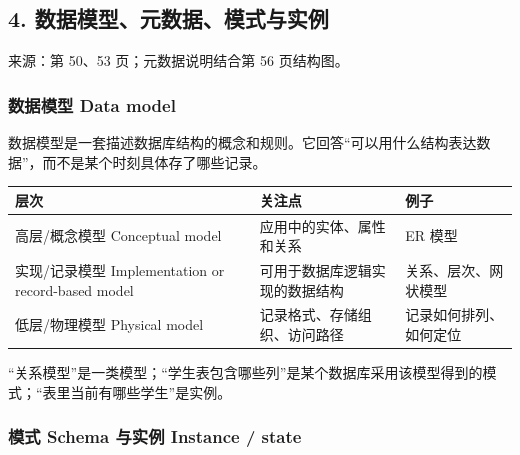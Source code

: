 \subsection{4. 数据模型、元数据、模式与实例}\label{01_database_fundamentals_zh-ux6570ux636eux6a21ux578bux5143ux6570ux636eux6a21ux5f0fux4e0eux5b9eux4f8b}

来源：第 50、53 页；元数据说明结合第 56 页结构图。

\subsubsection{数据模型 Data model}\label{01_database_fundamentals_zh-ux6570ux636eux6a21ux578b-data-model}

数据模型是一套描述数据库结构的概念和规则。它回答``可以用什么结构表达数据''，而不是某个时刻具体存了哪些记录。

\begin{longtable}[]{@{}
  >{\raggedright\arraybackslash}p{}
  >{\raggedright\arraybackslash}p{}
  >{\raggedright\arraybackslash}p{}@{}}
\toprule\noalign{}
\begin{minipage}[b]{\linewidth}\raggedright
层次
\end{minipage} & \begin{minipage}[b]{\linewidth}\raggedright
关注点
\end{minipage} & \begin{minipage}[b]{\linewidth}\raggedright
例子
\end{minipage} \\
\midrule\noalign{}
\endhead
\bottomrule\noalign{}
\endlastfoot
高层/概念模型 Conceptual model & 应用中的实体、属性和关系 & ER 模型 \\
实现/记录模型 Implementation or record-based model & 可用于数据库逻辑实现的数据结构 & 关系、层次、网状模型 \\
低层/物理模型 Physical model & 记录格式、存储组织、访问路径 & 记录如何排列、如何定位 \\
\end{longtable}

``关系模型''是一类模型；``学生表包含哪些列''是某个数据库采用该模型得到的模式；``表里当前有哪些学生''是实例。

\subsubsection{模式 Schema 与实例 Instance / state}\label{01_database_fundamentals_zh-ux6a21ux5f0f-schema-ux4e0eux5b9eux4f8b-instance-state}

